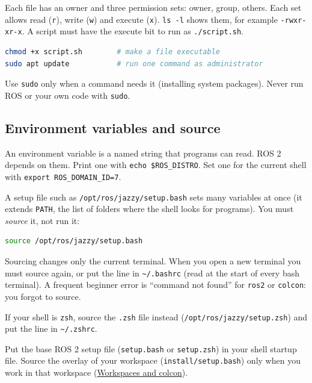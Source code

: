 \documentclass[11pt,a4paper]{article}
\begin{document}
Each file has an owner and three permission sets: owner, group, others.
Each set allows read (\texttt{r}), write (\texttt{w}) and execute
(\texttt{x}). \texttt{ls -l} shows them, for example
\texttt{-rwxr-xr-x}. A script must have the execute bit to run as
\texttt{./script.sh}.

\begin{lstlisting}[language=bash]
chmod +x script.sh        # make a file executable
sudo apt update           # run one command as administrator
\end{lstlisting}

Use \texttt{sudo} only when a command needs it (installing system
packages). Never run ROS or your own code with \texttt{sudo}.

\subsection{Environment variables and
	source}\label{environment-variables-and-source}

An environment variable is a named string that programs can read. ROS 2
depends on them. Print one with \texttt{echo \$ROS\_DISTRO}. Set one
for the current shell with \texttt{export ROS\_DOMAIN\_ID=7}.

A setup file such as \texttt{/opt/ros/jazzy/setup.bash} sets many
variables at once (it extends \texttt{PATH}, the list of folders where
the shell looks for programs). You must \emph{source} it, not run it:

\begin{lstlisting}[language=bash]
source /opt/ros/jazzy/setup.bash
\end{lstlisting}

Sourcing changes only the current terminal. When you open a new terminal
you must source again, or put the line in
\texttt{\textasciitilde{}/.bashrc} (read at the start of every bash
terminal). A frequent beginner error is ``command not found'' for
\texttt{ros2} or \texttt{colcon}: you forgot to source.

\begin{note}
	If your shell is \texttt{zsh}, source the \texttt{.zsh} file instead
	(\texttt{/opt/ros/jazzy/setup.zsh}) and put the line in
	\texttt{\textasciitilde{}/.zshrc}.
\end{note}

\begin{tip}
	Put the base ROS 2 setup file (\texttt{setup.bash} or
	\texttt{setup.zsh}) in your shell startup file. Source the overlay of
	your workspace (\texttt{install/setup.bash}) only when you work in that
	workspace (\hyperref[workspaces-and-colcon]{Workspaces and colcon}).
\end{tip}
\end{document}
